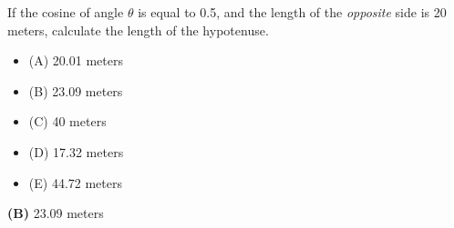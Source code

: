 

If the cosine of angle $\theta$ is equal to 0.5, and the length of the {\it opposite} side is 20 meters, calculate the length of the hypotenuse.

\begin{itemize}
\item{(A)} 20.01 meters
\vskip 5pt 
\item{(B)} 23.09 meters
\vskip 5pt 
\item{(C)} 40 meters
\vskip 5pt 
\item{(D)} 17.32 meters
\vskip 5pt 
\item{(E)} 44.72 meters
\end{itemize}







{\bf (B)} 23.09 meters
 










